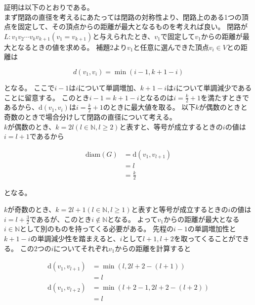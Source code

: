 \documentclass[uplatex,dvipdfmx,a4paper,10pt]{jsarticle}
\begin{document}
証明は以下のとおりである。\\
\hspace{1em}まず閉路の直径を考えるにあたっては閉路の対称性より、閉路上のある1つの頂点を固定して、その頂点からの距離が最大となるものを考えれば良い。
閉路が\(L: v_1 v_2 \cdots v_k v_{k+1} (v_1 = v_{k+1})\)と与えられたとき、\(v_1\)で固定して\(v_1\)からの距離が最大となるときの値を求める。
補題2より\(v_1\)と任意に選んできた頂点\(v_i \in V\)との距離は

\begin{equation*}
  d(v_1, v_i) = \min(i-1, k+1-i)
\end{equation*}

\noindent となる。
ここで\(i-1\)は\(i\)について単調増加、\(k+1-i\)は\(i\)について単調減少であることに留意する。
このとき\(i-1 = k+1-i\)となるのは\(i = \frac{k}{2}+1\)を満たすときであるから、\(\text{d}(v_1, v_i)\)は\(i = \frac{k}{2}+1\)のときに最大値を取る。
以下\(k\)が偶数のときと奇数のときで場合分けして閉路の直径について考える。\\
\hspace{1em}\(k\)が偶数のとき、\(k=2l (l \in \mathbb{N}, l \geq 2)\)と表すと、等号が成立するときの\(i\)の値は\(i = l+1\)であるから

\begin{align*}
  \text{diam}(G) &= \text{d}(v_1, v_{l+1}) \\
                 &= l \\
                 &= \frac{k}{2} 
\end{align*}

\noindent となる。

\hspace{1em}\(k\)が奇数のとき、\(k = 2l+1 (l \in \mathbb{N}, l \geq 1)\)と表すと等号が成立するときの\(i\)の値は\(i = l+\frac{3}{2}\)であるが、このとき\(i \notin \mathbb{N}\)となる。
よって\(v_1\)からの距離が最大となる\(i \in \mathbb{N}\)として別のものを持ってくる必要がある。
先程の\(i-1\)の単調増加性と\(k+1-i\)の単調減少性を踏まえると、\(i\)として\(l+1, l+2\)を取ってくることができる。
この2つの\(i\)についてそれぞれ\(v_1\)からの距離を計算すると

\begin{align*}
  \text{d}(v_1, v_{l+1}) &= \min(l,2l+2-(l+1)) \\
                         &= l \\
  \text{d}(v_1, v_{l+2}) &= \min(l+2-1, 2l+2-(l+2)) \\
                         &= l
\end{align*}
\end{document}
